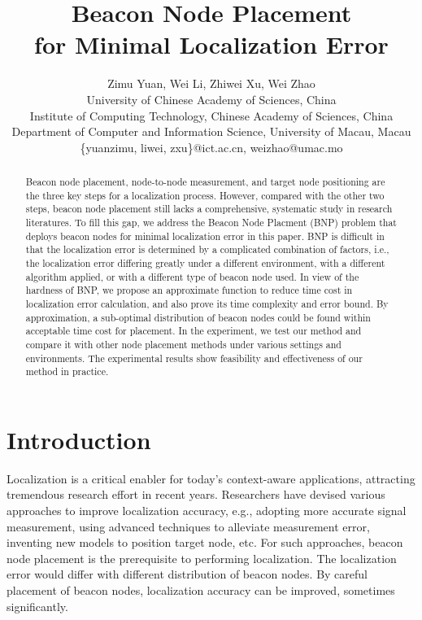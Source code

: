 \documentclass[10pt, conference, letterpaper]{IEEEtran}
\begin{document}
\title{Beacon Node Placement \\ for Minimal Localization Error}

\author{Zimu Yuan, Wei Li, Zhiwei Xu, Wei Zhao \\ University of Chinese Academy of Sciences, China\\
Institute of Computing Technology, Chinese Academy of Sciences, China\\
Department of Computer and Information Science, University of Macau, Macau\\
\{yuanzimu, liwei, zxu\}@ict.ac.cn, weizhao@umac.mo
}

\maketitle \thispagestyle{empty}

\begin{abstract}
Beacon node placement, node-to-node measurement, and target node positioning are the three key steps for a localization process. However, compared with the other two steps, beacon node placement still lacks a comprehensive, systematic study in research literatures. To fill this gap, we address the Beacon Node Placment (BNP) problem that deploys beacon nodes for minimal localization error in this paper. BNP is difficult in that the localization error is determined by a complicated combination of factors, i.e., the localization error differing greatly under a different environment, with a different algorithm applied, or with a different type of beacon node used. In view of the hardness of BNP, we propose an approximate function to reduce time cost in localization error calculation, and also prove its time complexity and error bound. By approximation, a sub-optimal distribution of beacon nodes could be found within acceptable time cost for placement. In the experiment, we test our method and compare it with other node placement methods under various settings and environments. The experimental results show feasibility and effectiveness of our method in practice.
\end{abstract}

\section{Introduction}
Localization is a critical enabler for today's context-aware applications, attracting tremendous research effort in recent years. Researchers have devised various approaches to improve localization accuracy, e.g., adopting more accurate signal measurement, using advanced techniques to alleviate measurement error, inventing new models to position target node, etc. For such approaches, beacon node placement is the prerequisite to performing localization. The localization error would differ with different distribution of beacon nodes. By careful placement of beacon nodes, localization accuracy can be improved, sometimes significantly.
\end{document}
